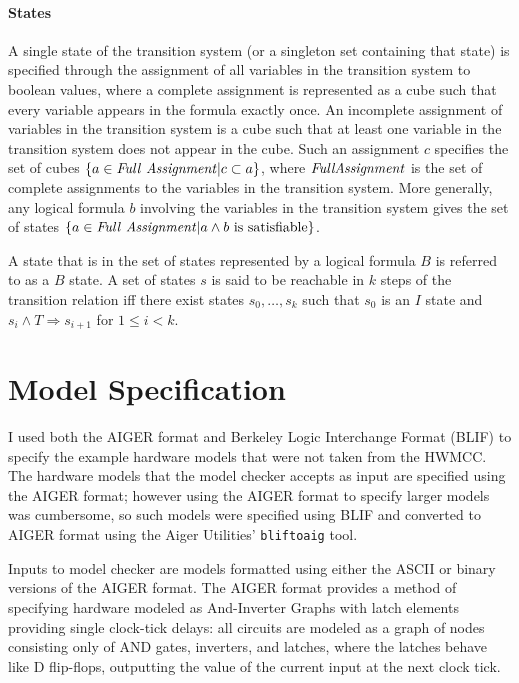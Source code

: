 \documentclass[12pt,a4paper,twoside,openright]{report}
\begin{document}
\paragraph{States}{
A single state of the transition system (or a singleton set containing that state)
is specified through the assignment of all variables in the transition system
to boolean values, where a complete assignment is represented as a cube such
that every variable appears in the formula exactly once.
An incomplete assignment of variables in the transition system is a cube such that
at least one variable in the transition system does not appear in the cube. Such an
assignment $c$ specifies the set of cubes $\{a \in{\it Full~Assignment}|c \subset a\}$,
where ${\it Full Assignment}$ is the set of complete assignments to the variables in the
transition system.
More generally, any logical formula $b$ involving the variables in the transition
system gives the set of states
$\{a \in {\it Full~Assignment} | a \wedge b~{\rm is~satisfiable}\}$.

A state that is in the set of states represented by a logical formula $B$ is referred to
as a $B$ state. A set of states $s$ is said to be reachable
in $k$ steps of the transition relation iff there exist states $s_0, \ldots, s_k$ such that
$s_0$ is an $I$ state and $s_i \wedge T \Rightarrow s_{i + 1}$ for $1 \leq i < k$.

}


\section{Model Specification}


I used both the AIGER format and Berkeley Logic Interchange Format (BLIF)
to specify the example hardware models that were not taken from the
HWMCC.
The hardware models that the model checker accepts as input
are specified using the AIGER format;
however using the AIGER format to specify larger models was cumbersome,
so such models were specified using BLIF and converted to AIGER format
using the Aiger Utilities' \verb,bliftoaig, tool.

Inputs to model checker are models formatted using either the ASCII or
binary versions of the AIGER format.
The AIGER format provides a method of specifying hardware modeled as
And-Inverter Graphs with latch elements providing single clock-tick
delays: all circuits are modeled as a graph of nodes consisting only of
AND gates, inverters, and latches, where the latches behave like D
flip-flops, outputting the value of the current input at the next
clock tick.
\end{document}

